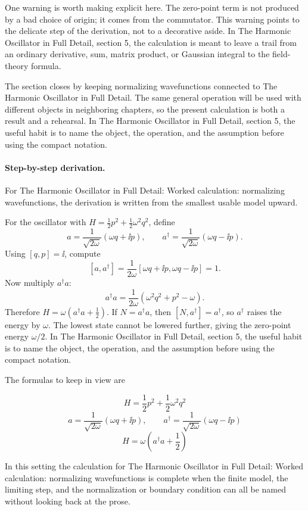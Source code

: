 One warning is worth making explicit here.  The zero-point term is not produced by a bad choice of origin; it comes from the commutator.  This warning points to the delicate step of the derivation, not to a decorative aside.  In The Harmonic Oscillator in Full Detail, section 5, the calculation is meant to leave a trail from an ordinary derivative, sum, matrix product, or Gaussian integral to the field-theory formula.

The section closes by keeping normalizing wavefunctions connected to The Harmonic Oscillator in Full Detail.  The same general operation will be used with different objects in neighboring chapters, so the present calculation is both a result and a rehearsal.  In The Harmonic Oscillator in Full Detail, section 5, the useful habit is to name the object, the operation, and the assumption before using the compact notation.



\paragraph{Step-by-step derivation.}

For The Harmonic Oscillator in Full Detail: Worked calculation: normalizing wavefunctions, the derivation is written from the smallest usable model upward.

For the oscillator with \(H=\frac12p^2+\frac12\omega^2q^2\), define
\[
  a=\frac{1}{\sqrt{2\omega}}(\omega q+\ii p),\qquad
  a^\dagger=\frac{1}{\sqrt{2\omega}}(\omega q-\ii p).
\]
Using \([q,p]=\ii\), compute
\[
  [a,a^\dagger]
  =
  \frac{1}{2\omega}[\omega q+\ii p,\omega q-\ii p]=1.
\]
Now multiply \(a^\dagger a\):
\[
  a^\dagger a=\frac{1}{2\omega}(\omega^2q^2+p^2-\omega).
\]
Therefore \(H=\omega(a^\dagger a+\frac12)\).  If \(N=a^\dagger a\), then \([N,a^\dagger]=a^\dagger\), so \(a^\dagger\) raises the energy by \(\omega\).  The lowest state cannot be lowered further, giving the zero-point energy \(\omega/2\).  In The Harmonic Oscillator in Full Detail, section 5, the useful habit is to name the object, the operation, and the assumption before using the compact notation.

The formulas to keep in view are

\[
  H=\frac12p^2+\frac12\omega^2q^2
\]
\[
  a=\frac{1}{\sqrt{2\omega}}(\omega q+\ii p),\qquad a^\dagger=\frac{1}{\sqrt{2\omega}}(\omega q-\ii p)
\]
\[
  H=\omega\left(a^\dagger a+\frac12\right)
\]

In this setting the calculation for The Harmonic Oscillator in Full Detail: Worked calculation: normalizing wavefunctions is complete when the finite model, the limiting step, and the normalization or boundary condition can all be named without looking back at the prose.





